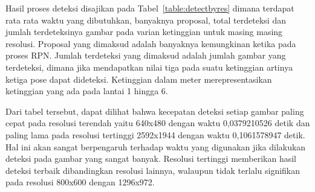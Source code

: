 \begin{table}[ht]
\centering
\caption{Jumlah Gambar Terdeteksi Berdasarkan Resolusi}
\label{table:detectbyres}
\end{table}

Hasil proses deteksi disajikan pada Tabel~\ref{table:detectbyres} dimana terdapat rata rata waktu yang dibutuhkan, banyaknya proposal, total terdeteksi dan jumlah terdeteksinya gambar pada varian ketinggian untuk masing masing resolusi. Proposal yang dimaksud adalah banyaknya kemungkinan ketika pada proses RPN. Jumlah terdeteksi yang dimaksud adalah jumlah gambar yang terdeteksi, dimana jika mendapatkan nilai tiga pada suatu ketinggian artinya ketiga pose dapat dideteksi. Ketinggian dalam meter merepresentasikan ketinggian yang ada pada lantai 1 hingga 6.

Dari tabel tersebut, dapat dilihat bahwa kecepatan deteksi setiap gambar paling cepat pada resolusi terendah yaitu 640x480 dengan waktu 0,0379210526 detik dan paling lama pada resolusi tertinggi 2592x1944 dengan waktu 0,1061578947 detik. Hal ini akan sangat berpengaruh terhadap waktu yang digunakan jika dilakukan deteksi pada gambar yang sangat banyak. Resolusi tertinggi memberikan hasil deteksi terbaik dibandingkan resolusi lainnya, walaupun tidak terlalu signifikan pada resolusi 800x600 dengan 1296x972.